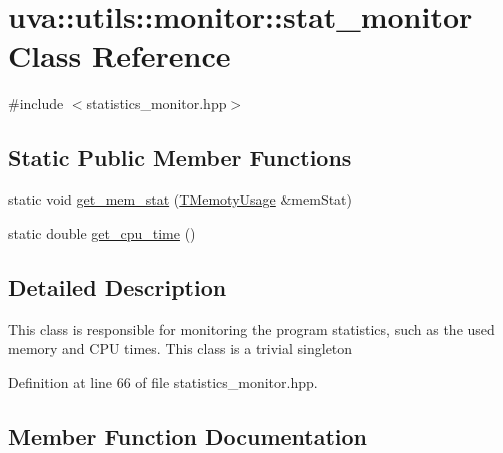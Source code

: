 \hypertarget{classuva_1_1utils_1_1monitor_1_1stat__monitor}{}\section{uva\+:\+:utils\+:\+:monitor\+:\+:stat\+\_\+monitor Class Reference}
\label{classuva_1_1utils_1_1monitor_1_1stat__monitor}


{\ttfamily \#include $<$statistics\+\_\+monitor.\+hpp$>$}

\subsection*{Static Public Member Functions}
\begin{DoxyCompactItemize}
\item 
static void \hyperlink{classuva_1_1utils_1_1monitor_1_1stat__monitor_a41f48cbf183be1e73597a593791bf36e}{get\+\_\+mem\+\_\+stat} (\hyperlink{namespaceuva_1_1utils_1_1monitor_a49c196b840bf3fd2dc8cab233952922a}{T\+Memoty\+Usage} \&mem\+Stat)
\item 
static double \hyperlink{classuva_1_1utils_1_1monitor_1_1stat__monitor_adefdb3403842852664323382047495db}{get\+\_\+cpu\+\_\+time} ()
\end{DoxyCompactItemize}


\subsection{Detailed Description}
This class is responsible for monitoring the program statistics, such as the used memory and C\+P\+U times. This class is a trivial singleton 

Definition at line 66 of file statistics\+\_\+monitor.\+hpp.



\subsection{Member Function Documentation}
\hypertarget{classuva_1_1utils_1_1monitor_1_1stat__monitor_adefdb3403842852664323382047495db}{}
